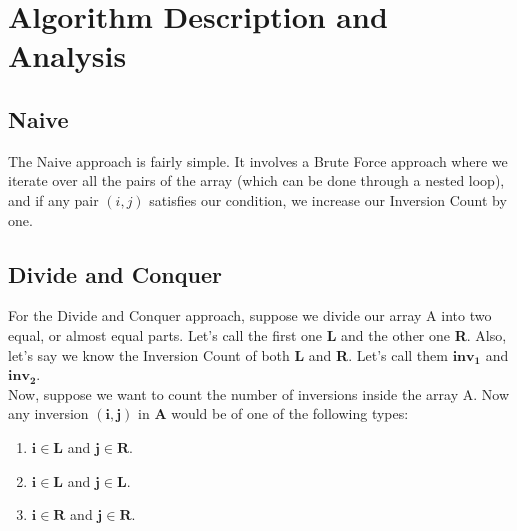 \documentclass[conference]{IEEEtran}
\begin{document}
\section{\textbf{Algorithm Description and Analysis}}

\subsection{Naive}

\noindent The Naive approach is fairly simple. It involves a Brute Force approach where we iterate over all the pairs of the array (which can be done through a nested loop), and if any pair $(i,j)$ satisfies our condition, we increase our Inversion Count by one.

\subsection{Divide and Conquer}
\noindent For the Divide and Conquer approach, suppose we divide our array A into two equal, or almost equal parts. Let's call the first one \textbf{L} and the other one \textbf{R}. Also, let's say we know the Inversion Count of both \textbf{L} and \textbf{R}. Let's call them $\bm{inv_1}$ and $\bm{inv_2}$. \\
Now, suppose we want to count the number of inversions inside the array A. Now any inversion $\bm{(i,j)}$ in \textbf{A} would be of one of the following types: \\

\begin{enumerate}
  \item  $\bm{i \in L}$ and $\bm{j \in R}$.
  \item  $\bm{i \in L}$ and $\bm{j \in L}$.
  \item  $\bm{i \in R}$ and $\bm{j \in R}$.
\end {enumerate}
\end{document}
